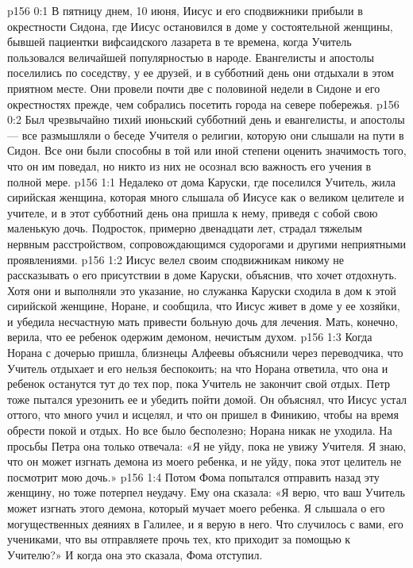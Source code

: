 \author{Комиссия срединников}
\vs p156 0:1 В пятницу днем, 10 июня, Иисус и его сподвижники прибыли в окрестности Сидона, где Иисус остановился в доме у состоятельной женщины, бывшей пациентки вифсаидского лазарета в те времена, когда Учитель пользовался величайшей популярностью в народе. Евангелисты и апостолы поселились по соседству, у ее друзей, и в субботний день они отдыхали в этом приятном месте. Они провели почти две с половиной недели в Сидоне и его окрестностях прежде, чем собрались посетить города на севере побережья.
\vs p156 0:2 Был чрезвычайно тихий июньский субботний день и евангелисты, и апостолы --- все размышляли о беседе Учителя о религии, которую они слышали на пути в Сидон. Все они были способны в той или иной степени оценить значимость того, что он им поведал, но никто из них не осознал всю важность его учения в полной мере.
\vs p156 1:1 Недалеко от дома Каруски, где поселился Учитель, жила сирийская женщина, которая много слышала об Иисусе как о великом целителе и учителе, и в этот субботний день она пришла к нему, приведя с собой свою маленькую дочь. Подросток, примерно двенадцати лет, страдал тяжелым нервным расстройством, сопровождающимся судорогами и другими неприятными проявлениями.
\vs p156 1:2 Иисус велел своим сподвижникам никому не рассказывать о его присутствии в доме Каруски, объяснив, что хочет отдохнуть. Хотя они и выполняли это указание, но служанка Каруски сходила в дом к этой сирийской женщине, Норане, и сообщила, что Иисус живет в доме у ее хозяйки, и убедила несчастную мать привести больную дочь для лечения. Мать, конечно, верила, что ее ребенок одержим демоном, нечистым духом.
\vs p156 1:3 Когда Норана с дочерью пришла, близнецы Алфеевы объяснили через переводчика, что Учитель отдыхает и его нельзя беспокоить; на что Норана ответила, что она и ребенок останутся тут до тех пор, пока Учитель не закончит свой отдых. Петр тоже пытался урезонить ее и убедить пойти домой. Он объяснял, что Иисус устал оттого, что много учил и исцелял, и что он пришел в Финикию, чтобы на время обрести покой и отдых. Но все было бесполезно; Норана никак не уходила. На просьбы Петра она только отвечала: «Я не уйду, пока не увижу Учителя. Я знаю, что он может изгнать демона из моего ребенка, и не уйду, пока этот целитель не посмотрит мою дочь.»
\vs p156 1:4 Потом Фома попытался отправить назад эту женщину, но тоже потерпел неудачу. Ему она сказала: «Я верю, что ваш Учитель может изгнать этого демона, который мучает моего ребенка. Я слышала о его могущественных деяниях в Галилее, и я верую в него. Что случилось с вами, его учениками, что вы отправляете прочь тех, кто приходит за помощью к Учителю?» И когда она это сказала, Фома отступил.
